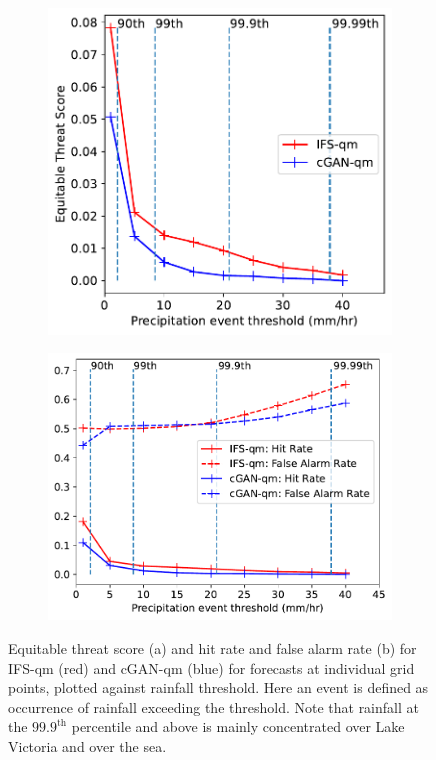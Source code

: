 \documentclass{article}
\begin{document}
\begin{figure}[ht!]
    \centering
     \begin{subfigure}[t]{0.45\textwidth}

     \includegraphics[width=\textwidth]{images/ets_final-nologs_217600.pdf}
     \caption{}
     \end{subfigure}
     \hfill
     \centering
     \begin{subfigure}[t]{0.49\textwidth}
     \includegraphics[width=\textwidth]{images/hit_rate_final-nologs_217600.pdf}
     \caption{}
     \end{subfigure}
     \caption{ Equitable threat score (a) and hit rate and false alarm rate (b) for IFS-qm (red) and cGAN-qm (blue) for forecasts at individual grid points, plotted against rainfall threshold. Here an event is defined as occurrence of rainfall exceeding the threshold. Note that rainfall at the $99.9^{\text{th}}$ percentile and above is mainly concentrated over Lake Victoria and over the sea.}
     \label{fig:ets}
\end{figure}
\end{document}
